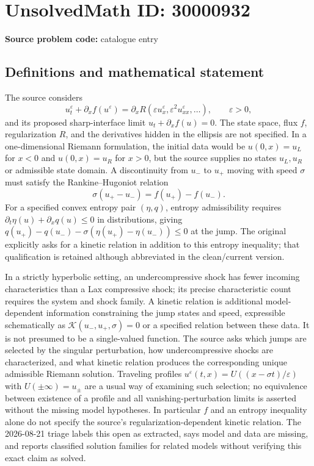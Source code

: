 \documentclass[11pt]{article}
\begin{document}
\section*{UnsolvedMath ID: 30000932}
\textbf{Source problem code:} catalogue entry
\subsection{Definitions and mathematical statement}
The source considers \[u_t^\varepsilon+\partial_x f(u^\varepsilon)=\partial_x R(\varepsilon u_x^\varepsilon,\varepsilon^2u_{xx}^\varepsilon,\ldots),\qquad \varepsilon>0,\] and its proposed sharp-interface limit $u_t+\partial_x f(u)=0$. The state space, flux $f$, regularization $R$, and the derivatives hidden in the ellipsis are not specified. In a one-dimensional Riemann formulation, the initial data would be $u(0,x)=u_L$ for $x<0$ and $u(0,x)=u_R$ for $x>0$, but the source supplies no states $u_L,u_R$ or admissible state domain. A discontinuity from $u_-$ to $u_+$ moving with speed $\sigma$ must satisfy the Rankine--Hugoniot relation \[\sigma(u_+-u_-)=f(u_+)-f(u_-).\] For a specified convex entropy pair $(\eta,q)$, entropy admissibility requires $\partial_t\eta(u)+\partial_xq(u)\leq0$ in distributions, giving $q(u_+)-q(u_-)-\sigma(\eta(u_+)-\eta(u_-))\leq0$ at the jump. The original explicitly asks for a kinetic relation in addition to this entropy inequality; that qualification is retained although abbreviated in the clean/current version.\par In a strictly hyperbolic setting, an undercompressive shock has fewer incoming characteristics than a Lax compressive shock; its precise characteristic count requires the system and shock family. A kinetic relation is additional model-dependent information constraining the jump states and speed, expressible schematically as $\mathcal K(u_-,u_+,\sigma)=0$ or a specified relation between these data. It is not presumed to be a single-valued function. The source asks which jumps are selected by the singular perturbation, how undercompressive shocks are characterized, and what kinetic relation produces the corresponding unique admissible Riemann solution. Traveling profiles $u^\varepsilon(t,x)=U((x-\sigma t)/\varepsilon)$ with $U(\pm\infty)=u_\pm$ are a usual way of examining such selection; no equivalence between existence of a profile and all vanishing-perturbation limits is asserted without the missing model hypotheses. In particular $f$ and an entropy inequality alone do not specify the source's regularization-dependent kinetic relation. The 2026-08-21 triage labels this open as extracted, says model and data are missing, and reports classified solution families for related models without verifying this exact claim as solved.
\end{document}
